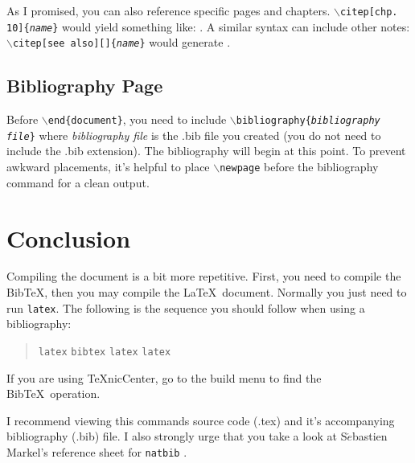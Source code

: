 \documentclass{article}
\begin{document}
As I promised, you can also reference specific pages and chapters. \texttt{$\backslash$citep[chp. 10]\{\textit{name}\}} would yield something like: \citep[chp. 10]{Rogers99}. A similar syntax can include other notes: \texttt{$\backslash$citep[see also][]\{\textit{name}\}} would generate \citep[see also][]{Rogers99}.

\subsection{Bibliography Page}

Before \texttt{$\backslash$end\{document\}}, you need to include \texttt{$\backslash$bibliography\{\textit{bibliography file}\}} where \textit{bibliography file} is the .bib file you created (you do not need to include the .bib extension). The bibliography will begin at this point. To prevent awkward placements, it's helpful to place \texttt{$\backslash$newpage} before the bibliography command for a clean output.

\section{Conclusion}

Compiling the document is a bit more repetitive. First, you need to compile the Bib\TeX, then you may compile the \LaTeX\ document. Normally you just need to run \texttt{latex}. The following is the sequence you should follow when using a bibliography:
\begin{quote}
\noindent
\texttt{latex}
\texttt{bibtex}
\texttt{latex}
\texttt{latex}
\end{quote}
If you are using \TeX nicCenter, go to the build menu to find the Bib\TeX\ operation.

I recommend viewing this commands source code (.tex) and it's accompanying bibliography (.bib) file. I also strongly urge that you take a look at S$\acute{e}$bastien Markel's reference sheet for \texttt{natbib} \citep{Markel}.


\end{document}
